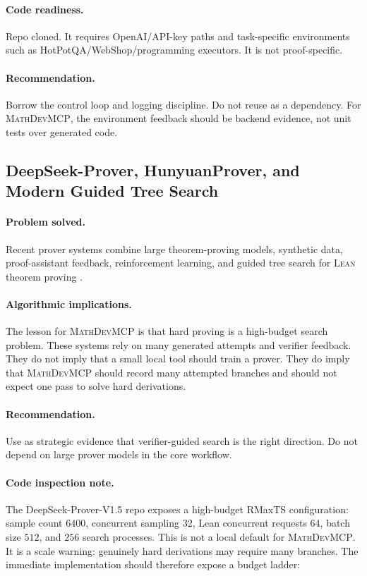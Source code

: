 \documentclass[11pt]{article}
\newcommand{\MathDevMCP}{\textsc{MathDevMCP}}
\newcommand{\Lean}{\textsc{Lean}}
\begin{document}
\paragraph{Code readiness.}
Repo cloned. It requires OpenAI/API-key paths and task-specific environments
such as HotPotQA/WebShop/programming executors. It is not proof-specific.

\paragraph{Recommendation.}
Borrow the control loop and logging discipline. Do not reuse as a dependency.
For \MathDevMCP, the environment feedback should be backend evidence, not unit
tests over generated code.

\subsection{DeepSeek-Prover, HunyuanProver, and Modern Guided Tree Search}

\paragraph{Problem solved.}
Recent prover systems combine large theorem-proving models, synthetic data,
proof-assistant feedback, reinforcement learning, and guided tree search for
\Lean{} theorem proving \cite{xin2024deepseekprover,deepseek2025v15,li2025hunyuanprover}.

\paragraph{Algorithmic implications.}
The lesson for \MathDevMCP{} is that hard proving is a high-budget search
problem. These systems rely on many generated attempts and verifier feedback.
They do not imply that a small local tool should train a prover. They do imply
that \MathDevMCP{} should record many attempted branches and should not expect
one pass to solve hard derivations.

\paragraph{Recommendation.}
Use as strategic evidence that verifier-guided search is the right direction.
Do not depend on large prover models in the core workflow.

\paragraph{Code inspection note.}
The DeepSeek-Prover-V1.5 repo exposes a high-budget RMaxTS configuration:
sample count \(6400\), concurrent sampling \(32\), Lean concurrent requests
\(64\), batch size \(512\), and \(256\) search processes. This is not a local
default for \MathDevMCP{}. It is a scale warning: genuinely hard derivations may
require many branches. The immediate implementation should therefore expose a
budget ladder:
\end{document}
